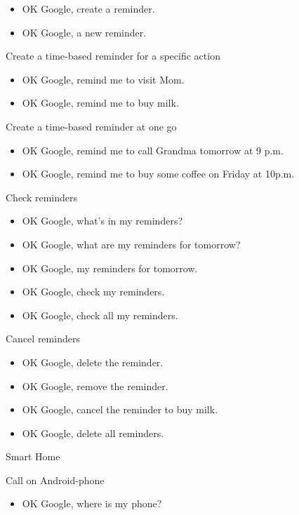 \documentclass[
  letterpaper,
  DIV=11,
  numbers=noendperiod]{scrartcl}
\providecommand{\tightlist}{%
  \setlength{\itemsep}{0pt}\setlength{\parskip}{0pt}}\usepackage{longtable,booktabs,array}
\begin{document}
\begin{itemize}
\item
  OK Google, create a reminder.
\item
  OK Google, a new reminder.
\end{itemize}

Create a time-based reminder for a specific action

\begin{itemize}
\item
  OK Google, remind me to visit Mom.
\item
  OK Google, remind me to buy milk.
\end{itemize}

Create a time-based reminder at one go

\begin{itemize}
\item
  OK Google, remind me to call Grandma tomorrow at 9 p.m.
\item
  OK Google, remind me to buy some coffee on Friday at 10p.m.
\end{itemize}

Check reminders

\begin{itemize}
\item
  OK Google, what's in my reminders?
\item
  OK Google, what are my reminders for tomorrow?
\item
  OK Google, my reminders for tomorrow.
\item
  OK Google, check my reminders.
\item
  OK Google, check all my reminders.
\end{itemize}

Cancel reminders

\begin{itemize}
\item
  OK Google, delete the reminder.
\item
  OK Google, remove the reminder.
\item
  OK Google, cancel the reminder to buy milk.
\item
  OK Google, delete all reminders.
\end{itemize}

Smart Home

Call on Android-phone

\begin{itemize}
\tightlist
\item
  OK Google, where is my phone?
\end{itemize}
\end{document}
